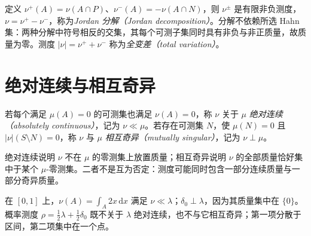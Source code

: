 定义 $\nu^+(A)=\nu(A\cap P)$、$\nu^-(A)=-\nu(A\cap N)$，则 $\nu^\pm$ 是有限非负测度，$\nu=\nu^+-\nu^-$，称为\emph{Jordan 分解（Jordan decomposition）}。分解不依赖所选 Hahn 集：两种分解中符号相反的交集，其每个可测子集同时具有非负与非正质量，故质量为零。测度 $|\nu|=\nu^++\nu^-$ 称为\emph{全变差（total variation）}。

\section{绝对连续与相互奇异}
\begin{definition}
若每个满足 $\mu(A)=0$ 的可测集也满足 $\nu(A)=0$，称 $\nu$ 关于 $\mu$ \emph{绝对连续（absolutely continuous）}，记为 $\nu\ll\mu$。若存在可测集 $N$，使 $\mu(N)=0$ 且 $|\nu|(S\setminus N)=0$，称 $\nu$ 与 $\mu$ \emph{相互奇异（mutually singular）}，记为 $\nu\perp\mu$。
\end{definition}
绝对连续说明 $\nu$ 不在 $\mu$ 的零测集上放置质量；相互奇异说明 $\nu$ 的全部质量恰好集中于某个 $\mu$-零测集。二者不是互为否定：测度可能同时包含一部分连续质量与一部分奇异质量。

\begin{example}
在 $[0,1]$ 上，$\nu(A)=\int_A2x\,\mathrm dx$ 满足 $\nu\ll\lambda$；$\delta_0\perp\lambda$，因为其质量集中在 $\{0\}$。概率测度 $\rho=\tfrac12\lambda+\tfrac12\delta_0$ 既不关于 $\lambda$ 绝对连续，也不与它相互奇异；第一项分散于区间，第二项集中在一个点。
\end{example}

